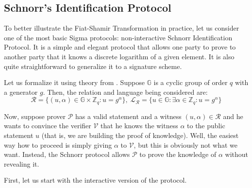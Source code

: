 \documentclass[../lecture-notes.tex]{subfiles}
\begin{document}
\subsection{Schnorr's Identification Protocol}

To better illustrate the Fiat-Shamir Transformation in practice, let us consider one of the most basic Sigma protocols: non-interactive Schnorr Identification Protocol. It is a simple and elegant protocol that allows one party to prove to another party that it knows a discrete logarithm of a given element. It is also quite straightforward to generalize it to a signature scheme.

Let us formalize it using theory from . Suppose $\mathbb{G}$ is a cyclic group of order $q$ with a generator $g$. Then, the relation and language being considered are:
\begin{equation*}
    \mathcal{R} = \{(u, \alpha) \in \mathbb{G} \times \mathbb{Z}_q: u = g^{\alpha}\}, \; \mathcal{L}_{\mathcal{R}} = \{u \in \mathbb{G}: \exists \alpha \in \mathbb{Z}_q: u = g^{\alpha}\}
\end{equation*}

Now, suppose prover $\mathcal{P}$ has a valid statement and a witness $(u,\alpha) \in \mathcal{R}$ and he wants to convince the verifier $\mathcal{V}$ that he knows the witness $\alpha$ to the public statement $u$ (that is, we are building the proof of knowledge). Well, the easiest way how to proceed is simply giving $\alpha$ to $\mathcal{V}$, but this is obviously not what we want. Instead, the Schnorr protocol allows $\mathcal{P}$ to prove the knowledge of $\alpha$ without revealing it. 

First, let us start with the interactive version of the protocol. 
\end{document}

